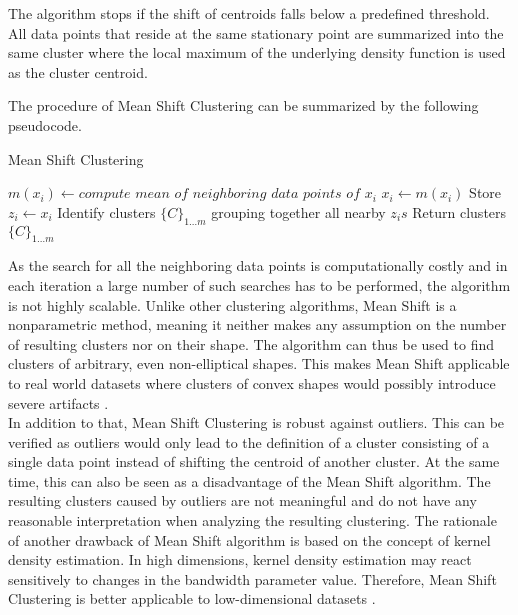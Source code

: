 The algorithm stops if the shift of centroids falls below a predefined threshold. All data points that reside at the same stationary point are summarized into the same cluster where the local maximum of the underlying density function is used as the cluster centroid. 

The procedure of Mean Shift Clustering can be summarized by the following pseudocode.
\begin{algorithm}
	\caption{Mean Shift Clustering} 
	\begin{algorithmic}[1]
				\State $m(x_{i})\leftarrow compute$ $mean$ $of$ $neighboring$ $data$ $points$ $of$ $x_{i}$
				\State $x_{i}\leftarrow m(x_{i})$
			\EndWhile
			\State Store $z_{i}\leftarrow x_{i}$ 
		\EndFor
		\State Identify clusters $\{C\}_{1\ldots m}$ grouping together all nearby $z_{i}s$ 
		\State Return clusters $\{C\}_{1 \ldots m}$
	\end{algorithmic} 
\end{algorithm}

As the search for all the neighboring data points is computationally costly and in each iteration a large number of such searches has to be performed, the algorithm is not highly scalable. 
Unlike other clustering algorithms, Mean Shift is a nonparametric method, meaning it neither makes any assumption on the number of resulting clusters nor on their shape. The algorithm can thus be used to find clusters of arbitrary, even non-elliptical shapes. This makes Mean Shift applicable to real world datasets where clusters of convex shapes would possibly introduce severe artifacts \cite{comaniciu2002MeanShift}.\\
In addition to that, Mean Shift Clustering is robust against outliers. This can be verified as outliers would only lead to the definition of a cluster consisting of a single data point instead of shifting the centroid of another cluster. At the same time, this can also be seen as a disadvantage of the Mean Shift algorithm.
The resulting clusters caused by outliers are not meaningful and do not have any reasonable interpretation when analyzing the resulting clustering. 
The rationale of another drawback of Mean Shift algorithm is based on the concept of kernel density estimation. In high dimensions, kernel density estimation may react sensitively to changes in the bandwidth parameter value. Therefore, Mean Shift Clustering is better applicable to low-dimensional datasets \cite{CarreiraPerpin2015ARO}.